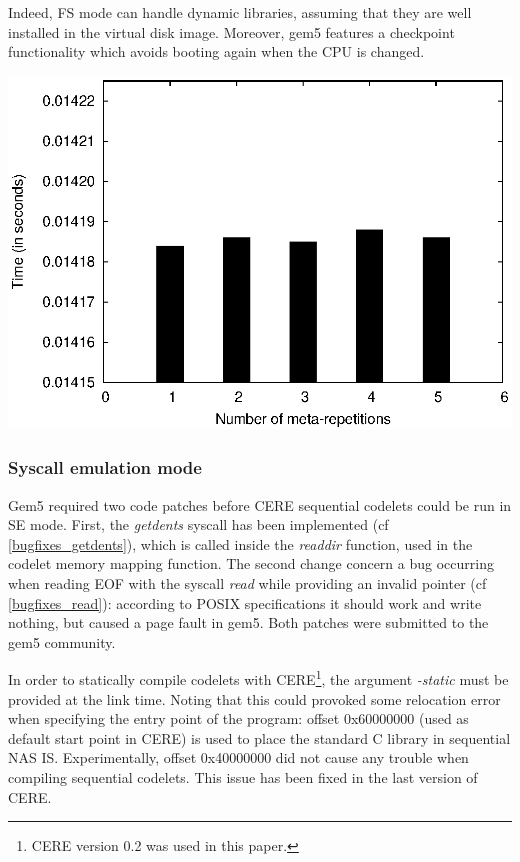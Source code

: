 \documentclass{article}
\newenvironment{Figure}
  {\par\medskip\noindent\center\minipage{0.9\linewidth}}
  {\endminipage\par\bigskip\medskip}
\begin{document}
\begin{multicols}{2}
Indeed, FS mode can handle dynamic libraries, assuming that they are well installed in the virtual disk image. 
Moreover, gem5 features a checkpoint functionality which avoids booting again when the CPU is changed.


\begin{Figure}
\centering
\includegraphics[width=\linewidth]{vari_se.eps}
\end{Figure}

\subsubsection{Syscall emulation mode}
Gem5 required two code patches before CERE sequential codelets could be run in SE mode. First, the \textit{getdents} syscall has been implemented (cf \ref{bugfixes_getdents}), which is called inside the \textit{readdir} function, used in the codelet memory mapping function.
The second change concern a bug occurring when reading EOF with the syscall \textit{read} while providing an invalid pointer (cf \ref{bugfixes_read}): according to POSIX specifications it should work and write nothing, but caused a page fault in gem5. Both patches were submitted to the gem5 community.


In order to statically compile codelets with CERE\footnote{CERE version 0.2 was used in this paper.}, the argument \textit{-static} must be provided at the link time. Noting that this could provoked some relocation error when specifying the entry point of the program: offset 0x60000000 (used as default start point in CERE) is used to place the standard C library in sequential NAS IS. Experimentally, offset 0x40000000 did not cause any trouble when compiling sequential codelets. This issue has been fixed in the last version of CERE.


\end{multicols}
\end{document}
